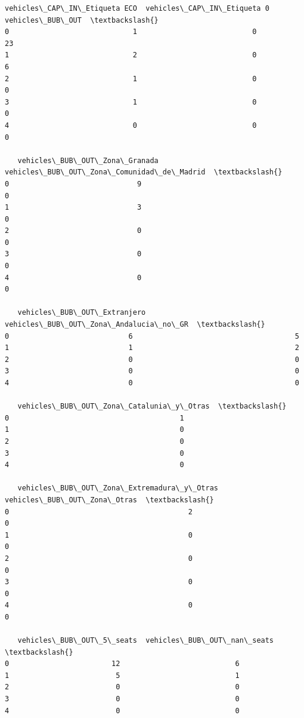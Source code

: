 \documentclass[11pt]{article}
\begin{document}
\begin{tcolorbox}[breakable, size=fbox, boxrule=.5pt, pad at break*=1mm, opacityfill=0]
\begin{Verbatim}[commandchars=\\\{\}]
   vehicles\_CAP\_IN\_Etiqueta ECO  vehicles\_CAP\_IN\_Etiqueta 0  vehicles\_BUB\_OUT  \textbackslash{}
0                             1                           0                23
1                             2                           0                 6
2                             1                           0                 0
3                             1                           0                 0
4                             0                           0                 0

   vehicles\_BUB\_OUT\_Zona\_Granada  vehicles\_BUB\_OUT\_Zona\_Comunidad\_de\_Madrid  \textbackslash{}
0                              9                                          0
1                              3                                          0
2                              0                                          0
3                              0                                          0
4                              0                                          0

   vehicles\_BUB\_OUT\_Extranjero  vehicles\_BUB\_OUT\_Zona\_Andalucia\_no\_GR  \textbackslash{}
0                            6                                      5
1                            1                                      2
2                            0                                      0
3                            0                                      0
4                            0                                      0

   vehicles\_BUB\_OUT\_Zona\_Catalunia\_y\_Otras  \textbackslash{}
0                                        1
1                                        0
2                                        0
3                                        0
4                                        0

   vehicles\_BUB\_OUT\_Zona\_Extremadura\_y\_Otras  vehicles\_BUB\_OUT\_Zona\_Otras  \textbackslash{}
0                                          2                            0
1                                          0                            0
2                                          0                            0
3                                          0                            0
4                                          0                            0

   vehicles\_BUB\_OUT\_5\_seats  vehicles\_BUB\_OUT\_nan\_seats  \textbackslash{}
0                        12                           6
1                         5                           1
2                         0                           0
3                         0                           0
4                         0                           0


\end{Verbatim}
\end{tcolorbox}
\end{document}

